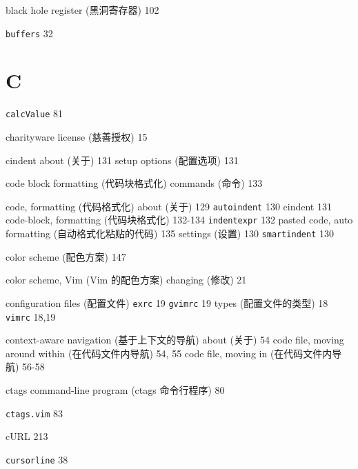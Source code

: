black hole register (黑洞寄存器) 102

\texttt{buffers} 32

\section{C}

\texttt{calcValue} 81

charityware license (慈善授权) 15

cindent
  about (关于) 131
  setup options (配置选项) 131

code block formatting (代码块格式化)
  commands (命令) 133

code, formatting (代码格式化)
  about (关于) 129
  \texttt{autoindent} 130
  cindent 131
  code-block, formatting (代码块格式化) 132-134
  \texttt{indentexpr} 132
  pasted code, auto formatting (自动格式化粘贴的代码) 135
  settings (设置) 130
  \texttt{smartindent} 130

color scheme (配色方案) 147

color scheme, Vim (Vim 的配色方案)
  changing (修改) 21

configuration files (配置文件)
  \texttt{exrc} 19
  \texttt{gvimrc} 19
  types (配置文件的类型) 18
  \texttt{vimrc} 18,19

context-aware navigation (基于上下文的导航)
  about (关于) 54
  code file, moving around within (在代码文件内导航) 54, 55
  code file, moving in (在代码文件内导航) 56-58

ctags command-line program (ctags 命令行程序) 80

\texttt{ctags.vim} 83

cURL 213

\texttt{cursorline} 38

